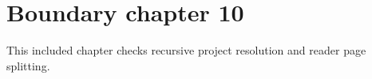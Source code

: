 \section{Boundary chapter 10}
\label{sec:boundary-10}
This included chapter checks recursive project resolution and reader page splitting.
